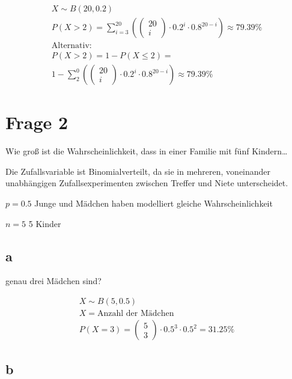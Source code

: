 \begin{align*}
    X \sim B(20, 0.2) \\
    P(X > 2) = \sum_{i = 3}^{20} \left(\begin{pmatrix}
        20 \\ i
    \end{pmatrix} \cdot 0.2^i \cdot 0.8^{20 - i}\right) \approx 79.39\%\\
    \text{Alternativ: } \\
    P(X > 2) = 1 - P(X \leq 2) = \\
    1 - \sum_{2}^{0}  \left(\begin{pmatrix}
        20 \\ i
    \end{pmatrix} \cdot 0.2^i \cdot 0.8^{20 - i}\right) \approx 79.39\%
\end{align*}

\section{Frage 2}

Wie groß ist die Wahrscheinlichkeit, dass in einer Familie mit fünf Kindern\dots

Die Zufallsvariable ist Binomialverteilt, da sie in mehreren, voneinander unabhängigen Zufallsexperimenten zwischen Treffer und Niete unterscheidet.

$p = 0.5$ Junge und Mädchen haben modelliert gleiche Wahrscheinlichkeit

$n = 5$ 5 Kinder

\subsection{a}

genau drei Mädchen sind?

\begin{align*}
    X \sim B(5, 0.5) \\
    X = \text{Anzahl der Mädchen} \\
    P(X = 3) = \begin{pmatrix}
        5 \\ 3
    \end{pmatrix} \cdot 0.5^3 \cdot 0.5^2 = 31.25\%
\end{align*}

\subsection{b}

